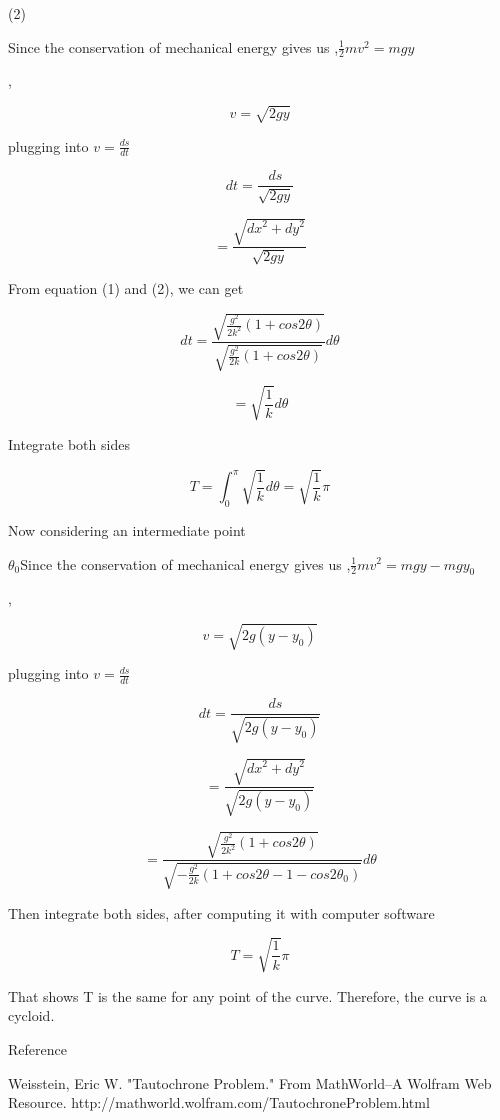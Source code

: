 \documentclass[10pt]{article}
\begin{document}
(2)

Since the conservation of mechanical energy gives us ,$\frac{1}{2}mv^2=mgy$

,

\[
v=\sqrt{2gy}
\]

plugging into
$v=\frac{ds}{dt}$

\[
dt=\frac{ds}{\sqrt{2gy}}
\]




\[
=\frac{\sqrt{{dx}^2+{dy}^2}}{\sqrt{2gy}}
\]

From equation (1) and (2), we can get


\[
dt=\frac{\sqrt{\frac{g^2}{2k^2}(1+cos2\theta{})}}{\sqrt{\frac{g^2}{2k}(1+cos2\theta{})}}d\theta{}
\]




\[
=\sqrt{\frac{1}{k}}d\theta{}
\]

Integrate both sides



\[
T=\int_0^{\pi{}}\sqrt{\frac{1}{k}}d\theta{}=\sqrt{\frac{1}{k}}\pi{}
\]

Now considering an intermediate point

${\theta{}}_0$Since the conservation of mechanical energy gives us
,$\frac{1}{2}mv^2=mgy-mgy_0$

,

\[
v=\sqrt{2g(y-y_0)}
\]

plugging into
$v=\frac{ds}{dt}$

\[
dt=\frac{ds}{\sqrt{2g(y-y_0)}}
\]



\[
=\frac{\sqrt{{dx}^2+{dy}^2}}{\sqrt{2g(y-y_0)}}
\]




\[
=\frac{\sqrt{\frac{g^2}{2k^2}(1+cos2\theta{})}}{\sqrt{-\frac{g^2}{2k}(1+cos2\theta{}-1-cos2{\theta{}}_0)}}d\theta{}
\]

Then integrate both sides, after computing it with computer software



\[
T=\sqrt{\frac{1}{k}}\pi{}
\]

That shows T is the same for any point of the curve. Therefore, the curve is a
cycloid.

Reference

Weisstein, Eric W. "Tautochrone Problem." From MathWorld--A Wolfram Web
Resource. http://mathworld.wolfram.com/TautochroneProblem.html
\end{document}
